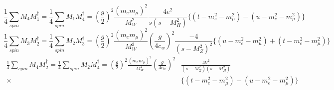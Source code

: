 \documentclass[11pt]{article}
\begin{document}
    \begin{equation}
    \frac{1}{4}\sum_{spin} M_4 M_1^{\dagger}=\frac{1}{4}\sum_{spin} M_1 M_4^{\dagger}=\left(\frac{g}{2}\right)^2\frac{(m_em_\mu)^2}{M_W^2}\frac{4e^2}{s(s-M_H^2)}\{ (t-m_e^2-m_\mu^2)-(u-m_e^2-m_\mu^2) \}
    \end{equation}
    \begin{equation}
    \frac{1}{4}\sum_{spin} M_3 M_2^{\dagger}=\frac{1}{4}\sum_{spin} M_2 M_3^{\dagger}=\left(\frac{g}{2}\right)^2\frac{(m_em_\mu)^2}{M_W^2}\left(\frac{g}{4c_w}\right)^2\frac{-4}{(s-M_Z^2)^2}\{ (u-m_e^2-m_\mu^2)+(t-m_e^2-m_\mu^2) \}
    \end{equation}
    \begin{equation}
    \begin{split}
    \frac{1}{4}\sum_{spin} M_4 M_2^{\dagger}=\frac{1}{4}\sum_{spin} M_2 M_4^{\dagger}=\left(\frac{g}{2}\right)^2\frac{(m_em_\mu)^2}{M_W^2}\left(\frac{g}{4c_w}\right)^2&\frac{4V^2}{(s-M_Z^2)(s-M_H^2)}\\
    \times&\{ (t-m_e^2-m_\mu^2)-(u-m_e^2-m_\mu^2) \}
    \end{split}
    \end{equation}
\end{document}
